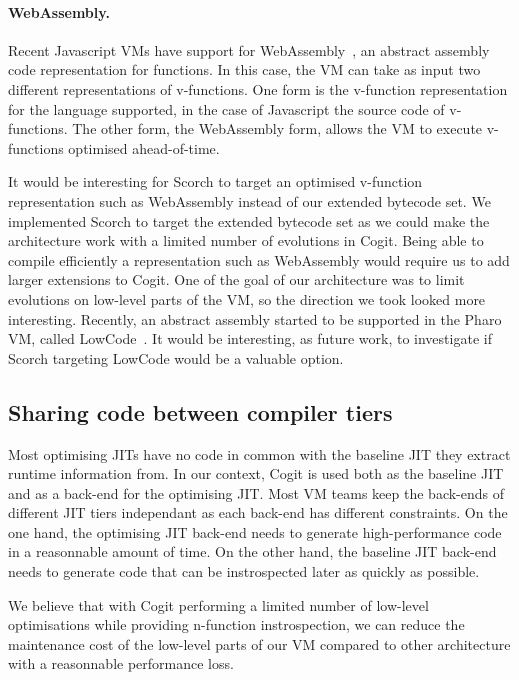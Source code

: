 \documentclass[a4paper,12pt,twoside]{../includes/ThesisStyle}
\begin{document}
\paragraph{WebAssembly.}
Recent Javascript VMs have support for WebAssembly~\cite{WebAssembly}, an abstract assembly code representation for functions. In this case, the VM can take as input two different representations of v-functions. One form is the v-function representation for the language supported, in the case of Javascript the source code of v-functions. The other form, the WebAssembly form, allows the VM to execute v-functions optimised ahead-of-time.

It would be interesting for Scorch to target an optimised v-function representation such as WebAssembly instead of our extended bytecode set. We implemented Scorch to target the extended bytecode set as we could make the architecture work with a limited number of evolutions in Cogit. Being able to compile efficiently a representation such as WebAssembly would require us to add larger extensions to Cogit. One of the goal of our architecture was to limit evolutions on low-level parts of the VM, so the direction we took looked more interesting. Recently, an abstract assembly started to be supported in the Pharo VM, called LowCode~\cite{Salg16a}. It would be interesting, as future work, to investigate if Scorch targeting LowCode would be a valuable option.

\subsection{Sharing code between compiler tiers}
\label{sec:codeSharing}

Most optimising JITs have no code in common with the baseline JIT they extract runtime information from. In our context, Cogit is used both as the baseline JIT and as a back-end for the optimising JIT. Most VM teams keep the back-ends of different JIT tiers independant as each back-end has different constraints. On the one hand, the optimising JIT back-end needs to generate high-performance code in a reasonnable amount of time. On the other hand, the baseline JIT back-end needs to generate code that can be instrospected later as quickly as possible. 

We believe that with Cogit performing a limited number of low-level optimisations while providing n-function instrospection, we can reduce the maintenance cost of the low-level parts of our VM compared to other architecture with a reasonnable performance loss. 
\end{document}
